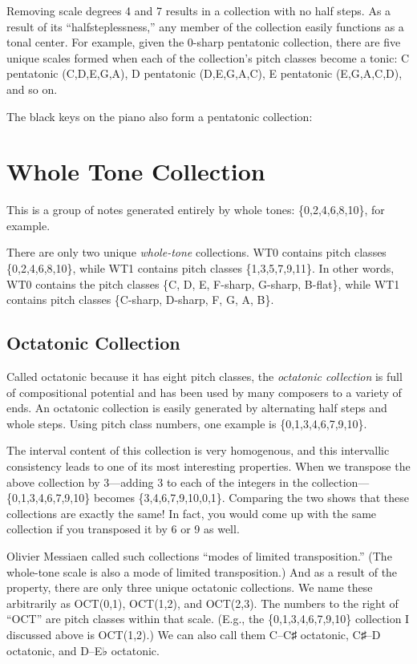\documentclass{book}
\begin{document}
Removing scale degrees 4 and 7 results in a collection with no half steps. As
a result of its ``halfsteplessness,'' any member of the collection easily
functions as a tonal center. For example, given the 0-sharp pentatonic
collection, there are five unique scales formed when each of the collection's
pitch classes become a tonic: C pentatonic (C,D,E,G,A), D pentatonic
(D,E,G,A,C), E pentatonic (E,G,A,C,D), and so on.

The black keys on the piano also form a pentatonic collection:

\hypertarget{whole-tone-collection}{%
\section{Whole Tone Collection}\label{whole-tone-collection}}

This is a group of notes generated entirely by whole tones: \{0,2,4,6,8,10\},
for example.

There are only two unique \emph{whole-tone} collections. WT0 contains pitch
classes \{0,2,4,6,8,10\}, while WT1 contains pitch classes \{1,3,5,7,9,11\}.
In other words, WT0 contains the pitch classes \{C, D, E, F-sharp, G-sharp,
B-flat\}, while WT1 contains pitch classes \{C-sharp, D-sharp, F, G, A, B\}.

\hypertarget{octatonic-collection}{%
\subsection{Octatonic Collection}\label{octatonic-collection}}

Called octatonic because it has eight pitch classes, the \emph{octatonic
collection} is full of compositional potential and has been used by many
composers to a variety of ends. An octatonic collection is easily generated by
alternating half steps and whole steps. Using pitch class numbers, one example
is \{0,1,3,4,6,7,9,10\}.

The interval content of this collection is very homogenous, and this
intervallic consistency leads to one of its most interesting properties. When
we transpose the above collection by 3---adding 3 to each of the integers in
the collection---\{0,1,3,4,6,7,9,10\} becomes \{3,4,6,7,9,10,0,1\}. Comparing
the two shows that these collections are exactly the same! In fact, you would
come up with the same collection if you transposed it by 6 or 9 as well.

Olivier Messiaen called such collections ``modes of limited transposition.''
(The whole-tone scale is also a mode of limited transposition.) And as a
result of the property, there are only three unique octatonic collections. We
name these arbitrarily as OCT(0,1), OCT(1,2), and OCT(2,3). The numbers to the
right of ``OCT'' are pitch classes within that scale. (E.g., the
\{0,1,3,4,6,7,9,10\} collection I discussed above is OCT(1,2).) We can also
call them C--C♯ octatonic, C♯--D octatonic, and D--E♭ octatonic.
\end{document}
